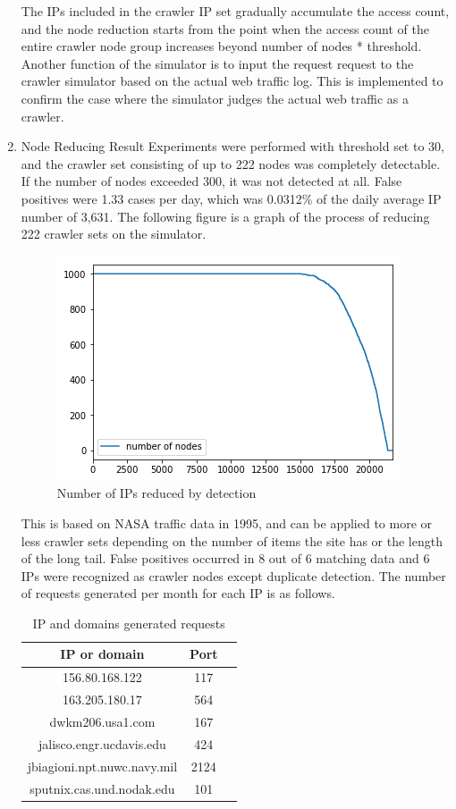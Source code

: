 \begin{enumerate}
The IPs included in the crawler IP set gradually accumulate the access count, and the node reduction starts from the point when the access count of the entire crawler node group increases beyond {number of nodes} * {threshold}.
Another function of the simulator is to input the request request to the crawler simulator based on the actual web traffic log. This is implemented to confirm the case where the simulator judges the actual web traffic as a crawler.
\newline
\item Node Reducing Result
\newline 
Experiments were performed with threshold set to 30, and the crawler set consisting of up to 222 nodes was completely detectable. If the number of nodes exceeded 300, it was not detected at all. False positives were 1.33 cases per day, which was 0.0312\% of the daily average IP number of 3,631. The following figure is a graph of the process of reducing 222 crawler sets on the simulator.

\begin{figure}[H]
    \centering
    \includegraphics[width=0.7\columnwidth]{figs/figure_06_nr.png}
    \caption{Number of IPs reduced by detection}
    \label{fig:my_label}
\end{figure}

This is based on NASA traffic data in 1995, and can be applied to more or less crawler sets depending on the number of items the site has or the length of the long tail.
False positives occurred in 8 out of 6 matching data and 6 IPs were recognized as crawler nodes except duplicate detection. The number of requests generated per month for each IP is as follows.


\begin{table}
  \caption{IP and domains generated requests}
  \label{tab:freq}
  \begin{tabular}{ccl}
    \toprule
    IP or domain&Port\\
    \midrule
    156.80.168.122 & 117\\
    163.205.180.17 & 564\\
    dwkm206.usa1.com & 167\\
    jalisco.engr.ucdavis.edu & 424\\
    jbiagioni.npt.nuwc.navy.mil & 2124\\
    sputnix.cas.und.nodak.edu & 101\\
  \bottomrule
\end{tabular}
\end{table}



\end{enumerate}
